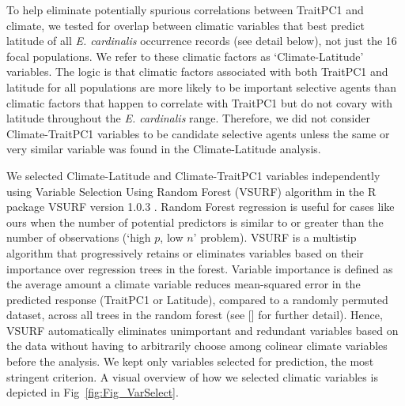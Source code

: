 \documentclass[11pt, oneside]{article}
\newcommand{\pkg}[1]{{\fontseries{b}\selectfont #1}}
\begin{document}
To help eliminate potentially spurious correlations between TraitPC1 and climate, we tested for overlap between climatic variables that best predict latitude of all \textit{E. cardinalis} occurrence records (see detail below), not just the 16 focal populations. We refer to these climatic factors as `Climate-Latitude' variables. The logic is that climatic factors associated with both TraitPC1 and latitude for all populations are more likely to be important selective agents than climatic factors that happen to correlate with TraitPC1 but do not covary with latitude throughout the \textit{E. cardinalis} range. Therefore, we did not consider Climate-TraitPC1 variables to be candidate selective agents unless the same or very similar variable was found in the Climate-Latitude analysis.

We selected Climate-Latitude and Climate-TraitPC1 variables independently using Variable Selection Using Random Forest (VSURF) algorithm in the R package \pkg{VSURF} version 1.0.3 \citep{Genuer_etal_2016}. Random Forest regression is useful for cases like ours when the number of potential predictors is similar to or greater than the number of observations (`high $p$, low $n$' problem). VSURF is a multistip algorithm that progressively retains or eliminates variables based on their importance over regression trees in the forest. Variable importance is defined as the average amount a climate variable reduces mean-squared error in the predicted response (TraitPC1 or Latitude), compared to a randomly permuted dataset, across all trees in the random forest (see \citeauthor{Genuer_etal_2015} [\citeyear{Genuer_etal_2015}] for further detail). Hence, VSURF automatically eliminates unimportant and redundant variables based on the data without having to arbitrarily choose among colinear climate variables before the analysis. We kept only variables selected for prediction, the most stringent criterion. A visual overview of how we selected climatic variables is depicted in Fig~\ref{fig:Fig_VarSelect}. 


\end{document}

